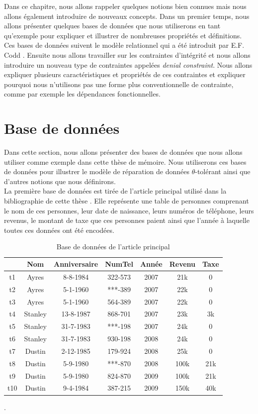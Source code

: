\documentclass[letterpaper, 12pt]{report}
\theoremstyle{definition}
\newcommand{\alinea}{
\hspace*{0.5cm}}
\begin{document}
\alinea Dans ce chapitre, nous allons rappeler quelques notions bien connues mais nous allons également introduire de nouveaux concepts. Dans un premier temps, nous allons présenter quelques bases de données que nous utiliserons en tant qu'exemple pour expliquer et illustrer de nombreuses propriétés et définitions. Ces bases de données suivent le modèle relationnel qui a été introduit par E.F. Codd \cite{misc1}. Ensuite nous allons travailler sur les contraintes d'intégrité et nous allons introduire un nouveau type de contraintes appelées \emph{denial constraint}. Nous allons expliquer plusieurs caractéristiques et propriétés de ces contraintes et expliquer pourquoi nous n'utilisons pas une forme plus conventionnelle de contrainte, comme par exemple les dépendances fonctionnelles.

\section{Base de données}

\alinea Dans cette section, nous allons présenter des bases de données que nous allons utiliser comme exemple dans cette thèse de mémoire. Nous utiliserons ces bases de données pour illustrer le modèle de réparation de données $\theta$-tolérant ainsi que d'autres notions que nous définirons.\\

La première base de données est tirée de l'article principal utilisé dans la bibliographie de cette thèse \cite{main}. Elle représente une table de personnes comprenant le nom de ces personnes, leur date de naissance, leurs numéros de téléphone, leurs revenus, le montant de taxe que ces personnes paient ainsi que l'année à laquelle toutes ces données ont été encodées.

\begin{table}[H]
	\centering
	\begin{tabular}{|c|c c c c c c|}
	\hline
	    & Nom & Anniversaire & NumTel & Année & Revenu & Taxe\\
	\hline
	 t1 & Ayres & 8-8-1984 & 322-573 & 2007 & 21k & 0\\
	 t2 & Ayres & 5-1-1960 & ***-389 & 2007 & 22k & 0 \\
	 t3 & Ayres & 5-1-1960 & 564-389 & 2007 & 22k & 0 \\
	 t4 & Stanley & 13-8-1987 & 868-701 & 2007 & 23k & 3k\\
	 t5 & Stanley & 31-7-1983 & ***-198 & 2007 & 24k & 0\\
	 t6 & Stanley & 31-7-1983 & 930-198 & 2008 & 24k & 0\\
	 t7 & Dustin & 2-12-1985 & 179-924 & 2008 & 25k & 0 \\
	 t8 & Dustin & 5-9-1980 & ***-870 & 2008 & 100k & 21k \\
	 t9 & Dustin & 5-9-1980 & 824-870 & 2009 & 100k & 21k \\
	 t10 & Dustin & 9-4-1984 & 387-215 & 2009 & 150k & 40k \\
	 \hline
	\end{tabular}
	\caption{\label{tableMain} Base de données de l'article principal \cite{main}}.
\end{table}
\end{document}
